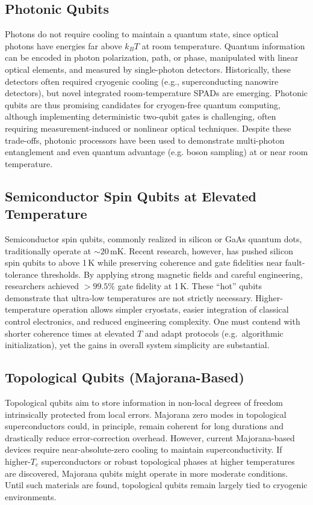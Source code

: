 \documentclass[11pt]{article}
\begin{document}
\subsection{Photonic Qubits}
Photons do not require cooling to maintain a quantum state, since optical photons have energies far above $k_B T$ at room temperature. Quantum information can be encoded in photon polarization, path, or phase, manipulated with linear optical elements, and measured by single-photon detectors. Historically, these detectors often required cryogenic cooling (e.g., superconducting nanowire detectors), but novel integrated room-temperature SPADs are emerging. Photonic qubits are thus promising candidates for cryogen-free quantum computing, although implementing deterministic two-qubit gates is challenging, often requiring measurement-induced or nonlinear optical techniques. Despite these trade-offs, photonic processors have been used to demonstrate multi-photon entanglement and even quantum advantage (e.g. boson sampling) at or near room temperature.

\subsection{Semiconductor Spin Qubits at Elevated Temperature}
Semiconductor spin qubits, commonly realized in silicon or GaAs quantum dots, traditionally operate at $\sim 20$\,mK. Recent research, however, has pushed silicon spin qubits to above 1\,K while preserving coherence and gate fidelities near fault-tolerance thresholds. By applying strong magnetic fields and careful engineering, researchers achieved $>99.5\%$ gate fidelity at 1\,K. These “hot” qubits demonstrate that ultra-low temperatures are not strictly necessary. Higher-temperature operation allows simpler cryostats, easier integration of classical control electronics, and reduced engineering complexity. One must contend with shorter coherence times at elevated $T$ and adapt protocols (e.g.\ algorithmic initialization), yet the gains in overall system simplicity are substantial.

\subsection{Topological Qubits (Majorana-Based)}
Topological qubits aim to store information in non-local degrees of freedom intrinsically protected from local errors. Majorana zero modes in topological superconductors could, in principle, remain coherent for long durations and drastically reduce error-correction overhead. However, current Majorana-based devices require near-absolute-zero cooling to maintain superconductivity. If higher-$T_c$ superconductors or robust topological phases at higher temperatures are discovered, Majorana qubits might operate in more moderate conditions. Until such materials are found, topological qubits remain largely tied to cryogenic environments.
\end{document}
